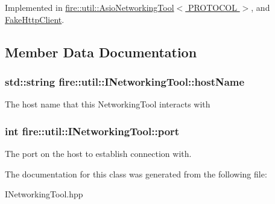Implemented in \hyperlink{a00039_a2ac524ceef89fceb928cf74420bf90a5}{fire\+::util\+::\+Asio\+Networking\+Tool$<$ P\+R\+O\+T\+O\+C\+O\+L $>$}, and \hyperlink{a00099_af775ada9f2a4e0939f06b733acb5e8ed}{Fake\+Http\+Client}.



\subsection{Member Data Documentation}
\subsubsection[{\texorpdfstring{host\+Name}{hostName}}]{\setlength{\rightskip}{0pt plus 5cm}std\+::string fire\+::util\+::\+I\+Networking\+Tool\+::host\+Name\hspace{0.3cm}{\ttfamily [protected]}}\hypertarget{a00156_ab7380b440faa49daffb65ca030380cde}{}\label{a00156_ab7380b440faa49daffb65ca030380cde}
The host name that this Networking\+Tool interacts with 
\subsubsection[{\texorpdfstring{port}{port}}]{\setlength{\rightskip}{0pt plus 5cm}int fire\+::util\+::\+I\+Networking\+Tool\+::port\hspace{0.3cm}{\ttfamily [protected]}}\hypertarget{a00156_ae640954c85632932a88037375a95abf4}{}\label{a00156_ae640954c85632932a88037375a95abf4}
The port on the host to establish connection with. 

The documentation for this class was generated from the following file\+:\begin{DoxyCompactItemize}
\item 
I\+Networking\+Tool.\+hpp\end{DoxyCompactItemize}
